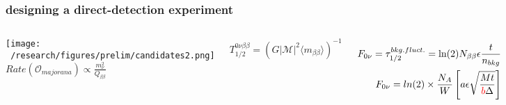 \documentclass{beamer}
\begin{document}
	\begin{frame}
		\frametitle{designing a direct-detection experiment}
		\begin{columns}[c] %
			
			\hspace*{-0.5cm}\texttt{[image: ~/research/figures/prelim/candidates2.png]}
			$Rate \left( \mathcal{O}_{majorana} \right) \propto \frac{m_{\nu}^2}{Q_{\beta\beta}}$
			
			\begin{equation*}
			T_{1/2}^{0\nu\beta\beta} = \left( G|\mathcal{M}|^2 \langle m_{\beta\beta}\rangle \right) ^{-1}
			\end{equation*}
			
%			
			\begin{eqnarray*}
			F_{0\nu} = \tau_{1/2}^{bkg. fluct.} = \text{ln}(2)N_{\beta\beta}\epsilon \frac{t}{n_{bkg}} \\
			F_{0\nu} = ln(2) \times \frac{N_A}{W} \left[ a\epsilon \sqrt{\frac{Mt}{\textcolor{red}{b}\Delta}}\right]
			\end{eqnarray*}
		\end{columns}
	\end{frame}
	
\end{document}
